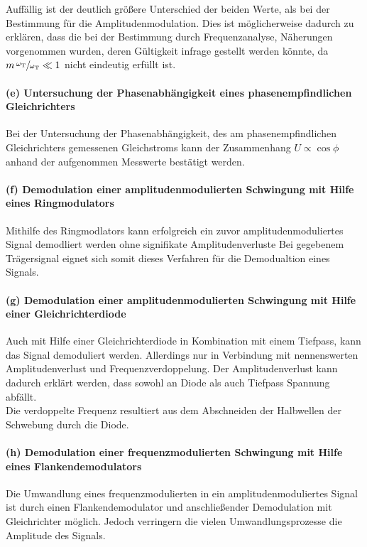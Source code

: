 Auffällig ist der deutlich größere Unterschied der beiden Werte,
als bei der Bestimmung für die Amplitudenmodulation.
Dies ist möglicherweise dadurch zu erklären, dass
die bei der Bestimmung durch Frequenzanalyse, Näherungen vorgenommen
wurden, deren Gültigkeit infrage gestellt werden könnte, da
$m \, \sfrac{\omega_{\text{T}}}{\omega_{\text{T}}}\ll1$
nicht eindeutig erfüllt ist.

\paragraph{(e) Untersuchung der Phasenabhängigkeit eines
phasenempfindlichen Gleichrichters}
Bei der Untersuchung der Phasenabhängigkeit, des am phasenempfindlichen
Gleichrichters gemessenen Gleichstroms kann der Zusammenhang $U \propto \cos \phi$ anhand der
aufgenommen Messwerte bestätigt werden.

\paragraph{(f) Demodulation einer amplitudenmodulierten Schwingung
mit Hilfe eines Ringmodulators}
Mithilfe des Ringmodlators kann erfolgreich
ein zuvor amplitudenmoduliertes Signal
demodliert werden ohne signifikate Amplitudenverluste
Bei gegebenem Trägersignal eignet sich somit dieses Verfahren für die
Demodualtion eines Signals.

\paragraph{(g) Demodulation einer amplitudenmodulierten Schwingung
mit Hilfe einer Gleichrichterdiode}
Auch mit Hilfe einer Gleichrichterdiode in Kombination mit einem
Tiefpass, kann das Signal demoduliert werden.
Allerdings nur in Verbindung mit nennenswerten
Amplitudenverlust und Frequenzverdoppelung.
Der Amplitudenverlust kann dadurch erklärt werden, dass sowohl
an Diode als auch Tiefpass Spannung abfällt.\\
Die verdoppelte Frequenz resultiert aus dem Abschneiden
der Halbwellen der Schwebung durch die Diode.
\paragraph{(h) Demodulation einer frequenzmodulierten Schwingung
mit Hilfe eines Flankendemodulators}
Die Umwandlung eines frequenzmodulierten in ein
amplitudenmoduliertes Signal ist durch einen Flankendemodulator
und anschließender Demodulation mit Gleichrichter
möglich. Jedoch verringern die
vielen Umwandlungsprozesse die Amplitude des Signals.

